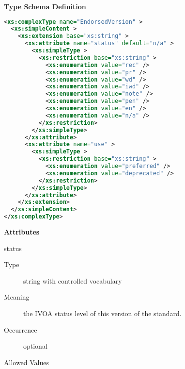 \documentclass[11pt,a4paper]{ivoa}
\begin{document}
\begin{generated}
\begingroup
        \renewcommand*\descriptionlabel[1]{%
        \hbox to 5.5em{\emph{#1}\hfil}}\vspace{1ex}\noindent\textbf{ Type Schema Definition}

\begin{lstlisting}[language=XML,basicstyle=\footnotesize]
<xs:complexType name="EndorsedVersion" >
  <xs:simpleContent >
    <xs:extension base="xs:string" >
      <xs:attribute name="status" default="n/a" >
        <xs:simpleType >
          <xs:restriction base="xs:string" >
            <xs:enumeration value="rec" />
            <xs:enumeration value="pr" />
            <xs:enumeration value="wd" />
            <xs:enumeration value="iwd" />
            <xs:enumeration value="note" />
            <xs:enumeration value="pen" />
            <xs:enumeration value="en" />
            <xs:enumeration value="n/a" />
          </xs:restriction>
        </xs:simpleType>
      </xs:attribute>
      <xs:attribute name="use" >
        <xs:simpleType >
          <xs:restriction base="xs:string" >
            <xs:enumeration value="preferred" />
            <xs:enumeration value="deprecated" />
          </xs:restriction>
        </xs:simpleType>
      </xs:attribute>
    </xs:extension>
  </xs:simpleContent>
</xs:complexType>
\end{lstlisting}

\vspace{0.5ex}\noindent\textbf{ Attributes}

\begingroup\small\begin{bigdescription}
\item[status]
\begin{description}
\item[Type] string with controlled vocabulary
\item[Meaning] 
                 the IVOA status level of this version of the standard.
               
\item[Occurrence] optional

\item[Allowed Values]\hfil
{}
\end{description}
\end{bigdescription}
\end{generated}
\end{document}
